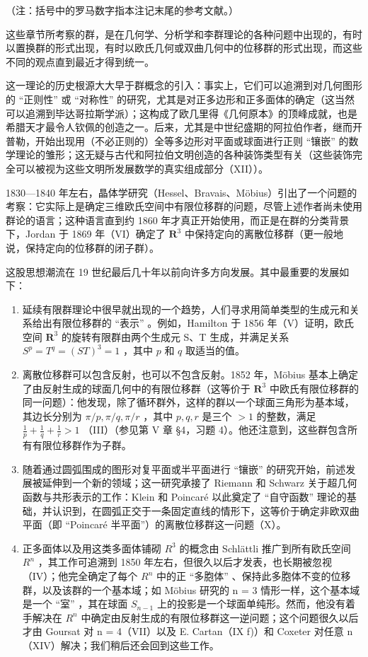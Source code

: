 
（注：括号中的罗马数字指本注记末尾的参考文献。）

这些章节所考察的群，是在几何学、分析学和李群理论的各种问题中出现的，有时以置换群的形式出现，有时以欧氏几何或双曲几何中的位移群的形式出现，而这些不同的观点直到最近才得到统一。

这一理论的历史根源大大早于群概念的引入：事实上，它们可以追溯到对几何图形的 ``正则性'' 或 ``对称性'' 的研究，尤其是对正多边形和正多面体的确定（这当然可以追溯到毕达哥拉斯学派）；这构成了欧几里得《几何原本》的顶峰成就，也是希腊天才最令人钦佩的创造之一。后来，尤其是中世纪盛期的阿拉伯作者，继而开普勒，开始出现用（不必正则的）全等多边形对平面或球面进行正则 ``镶嵌'' 的数学理论的雏形；这无疑与古代和阿拉伯文明创造的各种装饰类型有关（这些装饰完全可以被视为这些文明所发展数学的真实组成部分（XII））。

1830—1840 年左右，晶体学研究（Hessel、Bravais、Möbius）引出了一个问题的考察：它实际上是确定三维欧氏空间中有限位移群的问题，尽管上述作者尚未使用群论的语言；这种语言直到约 1860 年才真正开始使用，而正是在群的分类背景下，Jordan 于 1869 年（VI）确定了 \(\mathbf{R}^3\) 中保持定向的离散位移群（更一般地说，保持定向的位移群的闭子群）。

这股思想潮流在 19 世纪最后几十年以前向许多方向发展。其中最重要的发展如下：

\begin{enumerate}
\def\labelenumi{\arabic{enumi}.}
\item
  延续有限群理论中很早就出现的一个趋势，人们寻求用简单类型的生成元和关系给出有限位移群的 ``表示'' 。例如，Hamilton 于 1856 年（V）证明，欧氏空间 \(\mathbf{R}^3\) 的旋转有限群由两个生成元 S、T 生成，并满足关系 \(S^p = T^q = (ST)^3 = 1\) ，其中 \(p\) 和 \(q\) 取适当的值。
\item
  离散位移群可以包含反射，也可以不包含反射。1852 年，Möbius 基本上确定了由反射生成的球面几何中的有限位移群（这等价于 \(\mathbf{R}^3\) 中欧氏有限位移群的同一问题）：他发现，除了循环群外，这样的群以一个球面三角形为基本域，其边长分别为 \(\pi / p, \pi / q, \pi / r\) ，其中 \(p, q, r\) 是三个 \(>1\) 的整数，满足 \(\frac{1}{p} + \frac{1}{q} + \frac{1}{r} > 1\) （III）（参见第 V 章 §4，习题 4）。他还注意到，这些群包含所有有限位移群作为子群。
\item
  随着通过圆弧围成的图形对复平面或半平面进行 ``镶嵌'' 的研究开始，前述发展被延伸到一个新的领域；这一研究承接了 Riemann 和 Schwarz 关于超几何函数与共形表示的工作：Klein 和 Poincaré 以此奠定了 ``自守函数'' 理论的基础，并认识到，在圆弧正交于一条固定直线的情形下，这等价于确定非欧双曲平面（即 ``Poincaré 半平面''）的离散位移群这一问题（X）。
\item
  正多面体以及用这类多面体铺砌 \(R^{3}\) 的概念由 Schlättli 推广到所有欧氏空间 \(R^{n}\) ，其工作可追溯到 1850 年左右，但很久以后才发表，也长期被忽视（IV）；他完全确定了每个 \(R^{n}\) 中的正 ``多胞体'' 、保持此多胞体不变的位移群，以及该群的一个基本域；如 Möbius 研究的 n = 3 情形一样，这个基本域是一个 ``室'' ，其在球面 \(S_{n-1}\) 上的投影是一个球面单纯形。然而，他没有着手解决在 \(R^{n}\) 中确定由反射生成的有限位移群这一逆问题；这个问题很久以后才由 Goursat 对 n = 4（VII）以及 E. Cartan（IX f)）和 Coxeter 对任意 n（XIV）解决；我们稍后还会回到这些工作。
\end{enumerate}

